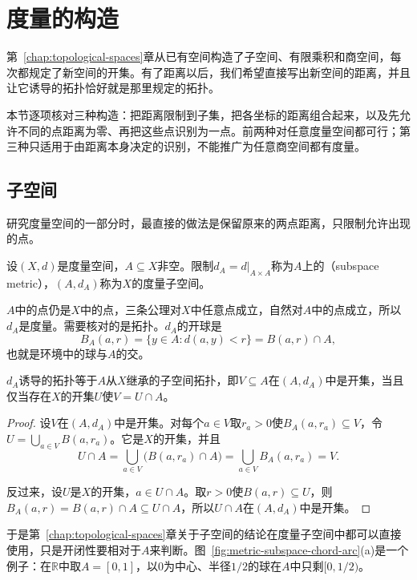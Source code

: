 \section{度量的构造}
\label{sec:metric-constructions}

第~\ref{chap:topological-spaces}章从已有空间构造了子空间、有限乘积和商空间，每次都规定了新空间的开集。有了距离以后，我们希望直接写出新空间的距离，并且让它诱导的拓扑恰好就是那里规定的拓扑。

本节逐项核对三种构造：把距离限制到子集，把各坐标的距离组合起来，以及先允许不同的点距离为零、再把这些点识别为一点。前两种对任意度量空间都可行；第三种只适用于由距离本身决定的识别，不能推广为任意商空间都有度量。

\subsection{子空间}
\label{sec:metric-subspace}

研究度量空间的一部分时，最直接的做法是保留原来的两点距离，只限制允许出现的点。

\begin{definition}[子空间度量]
\label{def:metric-subspace-metric}
设$(X,d)$是度量空间，$A\subseteq X$非空。限制$d_A=d|_{A\times A}$称为$A$上的（subspace metric），$(A,d_A)$称为$X$的度量子空间。
\end{definition}

$A$中的点仍是$X$中的点，三条公理对$X$中任意点成立，自然对$A$中的点成立，所以$d_A$是度量。需要核对的是拓扑。$d_A$的开球是
\[
B_A(a,r)=\{y\in A:d(a,y)<r\}=B(a,r)\cap A,
\]
也就是环境中的球与$A$的交。

\begin{theorem}[子空间度量的拓扑]
\label{thm:metric-subspace-topology}
$d_A$诱导的拓扑等于$A$从$X$继承的子空间拓扑，即$V\subseteq A$在$(A,d_A)$中是开集，当且仅当存在$X$的开集$U$使$V=U\cap A$。
\end{theorem}

\begin{proof}
设$V$在$(A,d_A)$中是开集。对每个$a\in V$取$r_a>0$使$B_A(a,r_a)\subseteq V$，令$U=\bigcup_{a\in V}B(a,r_a)$。它是$X$的开集，并且
\[
U\cap A=\bigcup_{a\in V}\bigl(B(a,r_a)\cap A\bigr)=\bigcup_{a\in V}B_A(a,r_a)=V.
\]

反过来，设$U$是$X$的开集，$a\in U\cap A$。取$r>0$使$B(a,r)\subseteq U$，则$B_A(a,r)=B(a,r)\cap A\subseteq U\cap A$，所以$U\cap A$在$(A,d_A)$中是开集。
\end{proof}

于是第~\ref{chap:topological-spaces}章关于子空间的结论在度量子空间中都可以直接使用，只是开闭性要相对于$A$来判断。图~\ref{fig:metric-subspace-chord-arc}(a)是一个例子：在$\mathbb R$中取$A=[0,1]$，以$0$为中心、半径$1/2$的球在$A$中只剩$[0,1/2)$。

